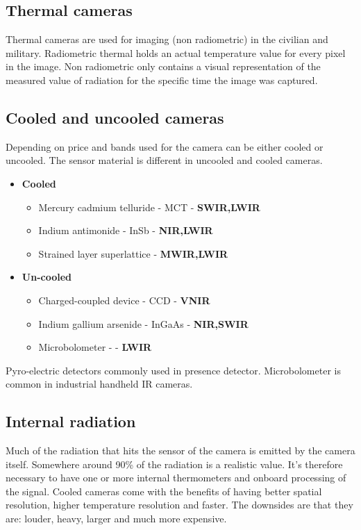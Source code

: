	\subsection{Thermal cameras}
	Thermal cameras are used for imaging (non radiometric) in the civilian and military. Radiometric thermal holds an actual temperature value for every pixel in the image. Non radiometric only contains a visual representation of the measured value of radiation for the specific time the image was captured. 

	\subsection{Cooled and uncooled cameras}
	Depending on price and bands used for the camera can be either cooled or uncooled. The sensor material is different in uncooled and cooled cameras.

	\begin{itemize}
		\item \textbf{Cooled}
		\begin{itemize}
			\item Mercury cadmium telluride - MCT - \textbf{SWIR,LWIR}
			\item Indium antimonide - InSb - \textbf{NIR,LWIR}
			\item Strained layer superlattice - \textbf{MWIR,LWIR} 
		\end{itemize}
		\item \textbf{Un-cooled}
		\begin{itemize}
			\item Charged-coupled device - CCD - \textbf{VNIR}
			\item Indium gallium arsenide - InGaAs - \textbf{NIR,SWIR}
			\item Microbolometer - - \textbf{LWIR}
		\end{itemize}
	\end{itemize}

	
	Pyro-electric detectors commonly used in presence detector. Microbolometer is common in industrial handheld IR cameras.

	\subsection{Internal radiation}
	Much of the radiation that hits the sensor of the camera is emitted by the camera itself. Somewhere around 90\% of the radiation is a realistic value. It's therefore necessary to have one or more internal thermometers and onboard processing of the signal. Cooled cameras come with the benefits of having better spatial resolution, higher temperature resolution and faster. The downsides are that they are: louder, heavy, larger and much more expensive.  

